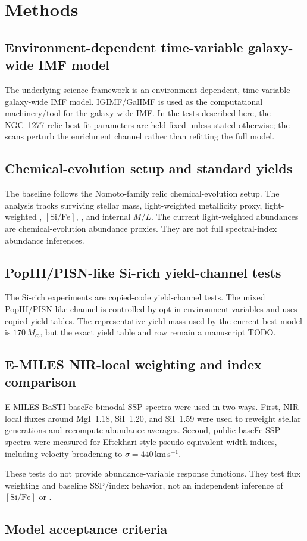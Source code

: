\section{Methods}

\subsection{Environment-dependent time-variable galaxy-wide IMF model}

The underlying science framework is an environment-dependent, time-variable galaxy-wide IMF model. IGIMF/GalIMF is used as the computational machinery/tool for the galaxy-wide IMF. In the tests described here, the NGC~1277 relic best-fit parameters are held fixed unless stated otherwise; the scans perturb the enrichment channel rather than refitting the full model.

\subsection{Chemical-evolution setup and standard yields}

The baseline follows the Nomoto-family relic chemical-evolution setup. The analysis tracks surviving stellar mass, light-weighted metallicity proxy, light-weighted \mgfe, $[\mathrm{Si}/\mathrm{Fe}]$, \simg, and internal $M/L$. The current light-weighted abundances are chemical-evolution abundance proxies. They are not full spectral-index abundance inferences.

\subsection{PopIII/PISN-like Si-rich yield-channel tests}

The Si-rich experiments are copied-code yield-channel tests. The mixed PopIII/PISN-like channel is controlled by opt-in environment variables and uses copied yield tables. The representative yield mass used by the current best model is $170\,M_\odot$, but the exact yield table and row remain a manuscript TODO.



\subsection{E-MILES NIR-local weighting and index comparison}

E-MILES BaSTI baseFe bimodal SSP spectra were used in two ways. First, NIR-local fluxes around MgI~1.18, SiI~1.20, and SiI~1.59 were used to reweight stellar generations and recompute abundance averages. Second, public baseFe SSP spectra were measured for Eftekhari-style pseudo-equivalent-width indices, including velocity broadening to $\sigma=440\,\mathrm{km\,s^{-1}}$.

These tests do not provide abundance-variable response functions. They test flux weighting and baseline SSP/index behavior, not an independent inference of $[\mathrm{Si}/\mathrm{Fe}]$ or \mgfe.

\subsection{Model acceptance criteria}


